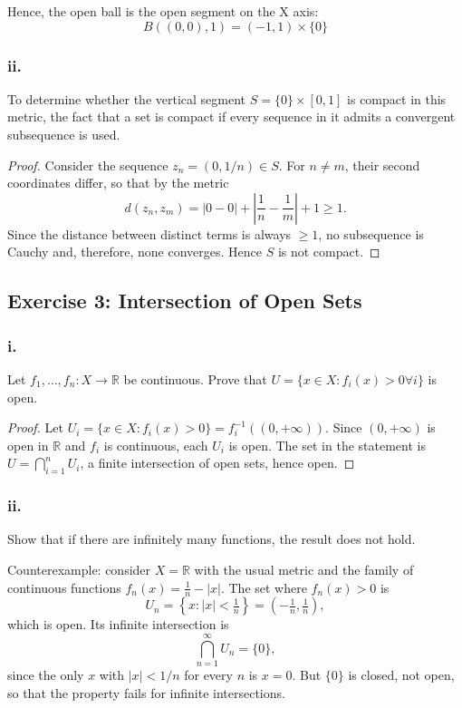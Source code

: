 \documentclass[11pt, a4paper]{article}
\begin{document}
Hence, the open ball is the open segment on the X axis:
$$ B((0,0), 1) = (-1, 1) \times \{0\} $$

\subsubsection*{ii.}
To determine whether the vertical segment $S = \{0\} \times [0,1]$ is compact in this metric, the fact
that a set is compact if every sequence in it admits a convergent subsequence is used.

\begin{proof}
Consider the sequence $z_n = (0, 1/n) \in S$. For $n \neq m$, their second coordinates differ,
so that by the metric
$$ d(z_n, z_m) = |0 - 0| + \left| \frac{1}{n} - \frac{1}{m} \right| + 1 \ge 1. $$
Since the distance between distinct terms is always $\ge 1$, no subsequence is Cauchy and,
therefore, none converges. Hence $S$ is not compact.
\end{proof}

\subsection*{Exercise 3: Intersection of Open Sets}

\subsubsection*{i.}
Let $f_1, \dots, f_n : X \to \mathbb{R}$ be continuous. Prove that
$U = \{ x \in X : f_i(x) > 0 \forall i \}$ is open.

\begin{proof}
Let $U_i = \{ x \in X : f_i(x) > 0 \} = f_i^{-1}((0, +\infty))$. Since $(0, +\infty)$ is open in
$\mathbb{R}$ and $f_i$ is continuous, each $U_i$ is open. The set in the statement is
$U = \bigcap_{i=1}^n U_i$, a finite intersection of open sets, hence open.
\end{proof}

\subsubsection*{ii.}
Show that if there are infinitely many functions, the result does not hold.

Counterexample: consider $X = \mathbb{R}$ with the usual metric and the family of continuous functions
$f_n(x) = \frac{1}{n} - |x|$. The set where $f_n(x) > 0$ is
$$ U_n = \left\{ x : |x| < \tfrac{1}{n} \right\} = \left(-\tfrac{1}{n}, \tfrac{1}{n}\right), $$
which is open. Its infinite intersection is
$$ \bigcap_{n=1}^\infty U_n = \{0\}, $$
since the only $x$ with $|x| < 1/n$ for every $n$ is $x = 0$. But $\{0\}$ is closed, not open, so
that the property fails for infinite intersections.
\end{document}
